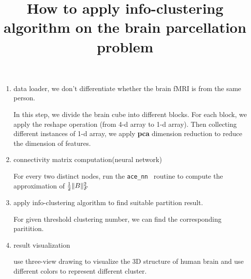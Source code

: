 \documentclass{article}
\title{How to apply info-clustering algorithm on the brain parcellation problem}
\DeclarePairedDelimiter\norm{\lVert}{\rVert}
\begin{document}
\maketitle
\begin{enumerate}
\item data loader, we don't differentiate whether the brain fMRI is from the same person.

In this step, we divide the brain cube into different blocks. For each block, we apply the reshape operation (from 4-d array to 1-d array). Then collecting different instances of 1-d array, we apply \textbf{pca} dimension reduction to reduce the dimension of features.

\item connectivity matrix computation(neural network)

For every two distinct nodes, run the \texttt{ace\_nn } routine to compute the approximation of $
\frac{1}{2}\norm{B}_F^2$

\item apply info-clustering algorithm to find suitable partition result.

For given threshold clustering number, we can find the corresponding paritition.

\item result visualization

use three-view drawing to visualize the 3D structure of human brain and  use different colors to represent different cluster.

\end{enumerate}
\end{document}
